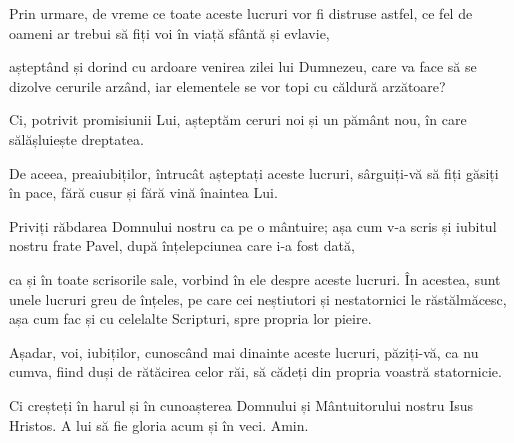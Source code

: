 {Prin urmare, de vreme ce toate aceste lucruri vor fi distruse astfel, ce fel de oameni ar trebui să fiți voi în viață sfântă și evlavie,

așteptând și dorind cu ardoare venirea zilei lui Dumnezeu, care va face să se dizolve cerurile arzând, iar elementele se vor topi cu căldură arzătoare?

Ci, potrivit promisiunii Lui, așteptăm ceruri noi și un pământ nou, în care sălășluiește dreptatea.


\par }{\PP {}De aceea, preaiubiților, întrucât așteptați aceste lucruri, sârguiți-vă să fiți găsiți în pace, fără cusur și fără vină înaintea Lui.

Priviți răbdarea Domnului nostru ca pe o mântuire; așa cum v-a scris și iubitul nostru frate Pavel, după înțelepciunea care i-a fost dată,

ca și în toate scrisorile sale, vorbind în ele despre aceste lucruri. În acestea, sunt unele lucruri greu de înțeles, pe care cei neștiutori și nestatornici le răstălmăcesc, așa cum fac și cu celelalte Scripturi, spre propria lor pieire.

Așadar, voi, iubiților, cunoscând mai dinainte aceste lucruri, păziți-vă, ca nu cumva, fiind duși de rătăcirea celor răi, să cădeți din propria voastră statornicie.

Ci creșteți în harul și în cunoașterea Domnului și Mântuitorului nostru Isus Hristos. A lui să fie gloria acum și în veci. Amin.


\par }